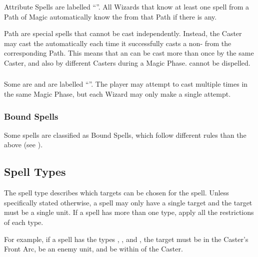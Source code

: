 Attribute Spells are labelled \enquote{\textbf{\attributespellnumber}}. All Wizards that know at least one spell from a Path of Magic automatically know the \attributespell{} from that Path if there is any.

Path \attributespells{} are special spells that cannot be cast independently. Instead, the Caster may cast the \attributespell{} automatically each time it successfully casts a non-\attributespell{} from the corresponding Path. This means that an \attributespell{} can be cast more than once by the same Caster, and also by different Casters during a Magic Phase. \attributespells{} cannot be dispelled.

\subsubsection{\replicablespells}
\idx[main=y]{\replicablespells}\label{replicable_spells}

Some \learnedspells{} are \replicablespells{} and are labelled \enquote{\textit{\textbf{\replicablespellnumber}}}. The player may attempt to cast \replicablespells{} multiple times in the same Magic Phase, but each Wizard may only make a single attempt.

\subsubsection{Bound Spells}
\label{bound_spells_classification}

Some spells are classified as Bound Spells, which follow different rules than the above (see ).

\subsection{Spell Types}
\label{spell_types}

The spell type describes which targets can be chosen for the spell. Unless specifically stated otherwise, a spell may only have a single target and the target must be a single unit. If a spell has more than one type, apply all the restrictions of each type.

For example, if a spell has the types \direct{}, \hex{}, and , the target must be in the Caster's Front Arc, be an enemy unit, and be within  of the Caster.

\paragraph{\augment}

